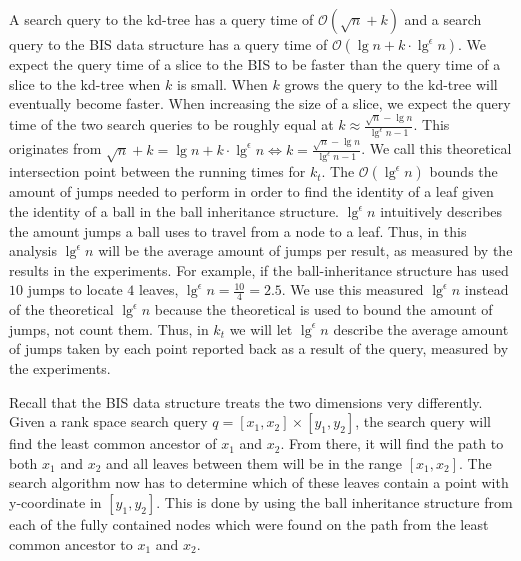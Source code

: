 A search query to the kd-tree has a query time of $\mathcal{O}(\sqrt{n}+k)$ and a search query to the BIS data structure has a query time of $\mathcal{O}(\lg n + k \cdot \lg^\epsilon n)$. We expect the query time of a slice to the BIS to be faster than the query time of a slice to the kd-tree when $k$ is small. When $k$ grows the query to the kd-tree will eventually become faster. When increasing the size of a slice, we expect the query time of the two search queries to be roughly equal at $k \approx \frac{\sqrt{n} - \lg n}{\lg^\epsilon n - 1}$. This originates from $\sqrt{n} + k = \lg n + k \cdot \lg^\epsilon n \Leftrightarrow k = \frac{\sqrt{n} - \lg n}{\lg^\epsilon n - 1}$. We call this theoretical intersection point between the running times for $k_t$. The $\mathcal{O}(\lg^\epsilon n)$ bounds the amount of jumps needed to perform in order to find the identity of a leaf given the identity of a ball in the ball inheritance structure. $\lg^\epsilon n$ intuitively describes the amount jumps a ball uses to travel from a node to a leaf. Thus, in this analysis $\lg^\epsilon n$ will be the average amount of jumps per result, as measured by the results in the experiments. For example, if the ball-inheritance structure has used $10$ jumps to locate $4$ leaves, $\lg^\epsilon n = \frac{10}{4} = 2.5$. We use this measured $\lg^\epsilon n$ instead of the theoretical $\lg^\epsilon n$ because the theoretical is used to bound the amount of jumps, not count them. Thus, in $k_t$ we will let $\lg^\epsilon n$ describe the average amount of jumps taken by each point reported back as a result of the query, measured by the experiments.

Recall that the BIS data structure treats the two dimensions very differently. Given a rank space search query $q = [x_1, x_2] \times [y_1, y_2]$, the search query will find the least common ancestor of $x_1$ and $x_2$. From there, it will find the path to both $x_1$ and $x_2$ and all leaves between them will be in the range $[x_1, x_2]$. The search algorithm now has to determine which of these leaves contain a point with y-coordinate in $[y_1, y_2]$. This is done by using the ball inheritance structure from each of the fully contained nodes which were found on the path from the least common ancestor to $x_1$ and $x_2$.

